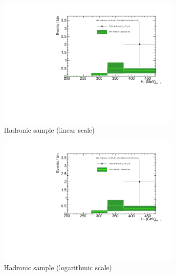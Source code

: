 \clearpage
\begin{figure}[h!]
  \centering
  \begin{subfigure}[b]{0.48\textwidth}
    \includegraphics[width=\textwidth,page=1]
    {Figs/results/v0/greenBand/bestFit_2012dev_RQcdZero_fZinvAll_ge4b_ge4j-1_smOnly}
    \caption{Hadronic sample (linear scale)}
  \end{subfigure}
  \begin{subfigure}[b]{0.48\textwidth}
    \includegraphics[width=\textwidth,page=2]
    {Figs/results/v0/greenBand/bestFit_2012dev_RQcdZero_fZinvAll_ge4b_ge4j-1_smOnly}
    \caption{Hadronic sample (logarithmic scale)}
  \end{subfigure}
  \begin{subfigure}[b]{0.48\textwidth}

\end{subfigure}
\end{figure}

